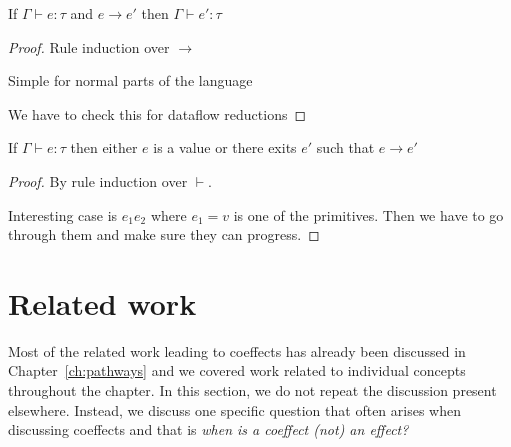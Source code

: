 \begin{theorem}
  If $\Gamma \vdash e : \tau$ and $e \rightarrow e'$ then $\Gamma \vdash e' : \tau$
\end{theorem}
\begin{proof}
  Rule induction over $\rightarrow$
  
Simple for normal parts of the language

We have to check this for dataflow reductions  
\end{proof}

\begin{theorem}[Progress]
  If $\Gamma \vdash e : \tau$ then either $e$ is a value or there exits $e'$ such that $e \rightarrow e'$
\end{theorem}
\begin{proof}
  By rule induction over $\vdash$.
  
Interesting case is $e_1 e_2$ where $e_1 = v$ is one of the primitives. Then we have to go through
them and make sure they can progress.  
\end{proof}




















\newpage
\newpage


%                                                 
%

\section{Related work}
\label{sec:flat-related}

Most of the related work leading to coeffects has already been discussed in Chapter~\ref{ch:pathways} 
and we covered work related to individual concepts throughout the chapter. In this section, we
do not repeat the discussion present elsewhere. Instead, we discuss one specific question that often 
arises when discussing coeffects and that is \emph{when is a coeffect (not) an effect?}

